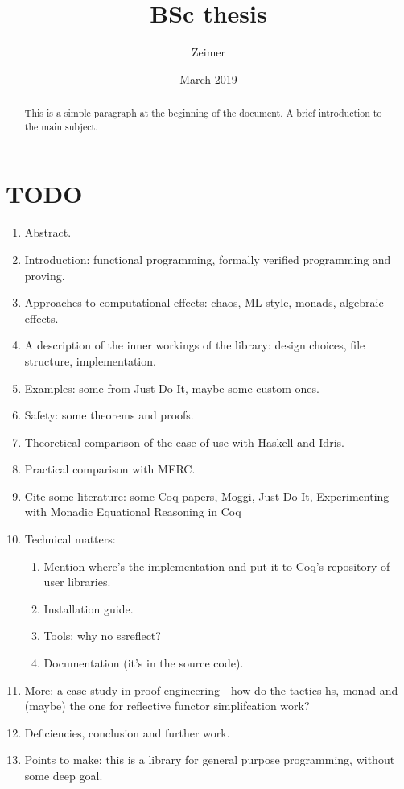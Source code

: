 \documentclass[11pt]{article}
\begin{document}
\title{BSc thesis}
\author{Zeimer}
\date{March 2019}

\begin{titlepage}

    \maketitle

    \begin{abstract}
    This is a simple paragraph at the beginning of the document. A brief introduction to the main subject.
    \end{abstract}

    \tableofcontents

\end{titlepage}

\section{TODO} \label{TODO}

\begin{enumerate}
    \item Abstract.
    \item Introduction: functional programming, formally verified programming and proving.
    \item Approaches to computational effects: chaos, ML-style, monads, algebraic effects.
    \item A description of the inner workings of the library: design choices, file structure, implementation.
    \item Examples: some from Just Do It, maybe some custom ones.
    \item Safety: some theorems and proofs.
    \item Theoretical comparison of the ease of use with Haskell and Idris.
    \item Practical comparison with MERC.
    \item Cite some literature: some Coq papers, Moggi, Just Do It, Experimenting with Monadic Equational Reasoning in Coq
    \item Technical matters:
    \begin{enumerate}
        \item Mention where's the implementation and put it to Coq's repository of user libraries.
        \item Installation guide.
        \item Tools: why no ssreflect?
        \item Documentation (it's in the source code).
    \end{enumerate}
    \item More: a case study in proof engineering - how do the tactics hs, monad and (maybe) the one for reflective functor simplifcation work?
    \item Deficiencies, conclusion and further work.
    \item Points to make: this is a library for general purpose programming, without some deep goal.
\end{enumerate}
\end{document}
